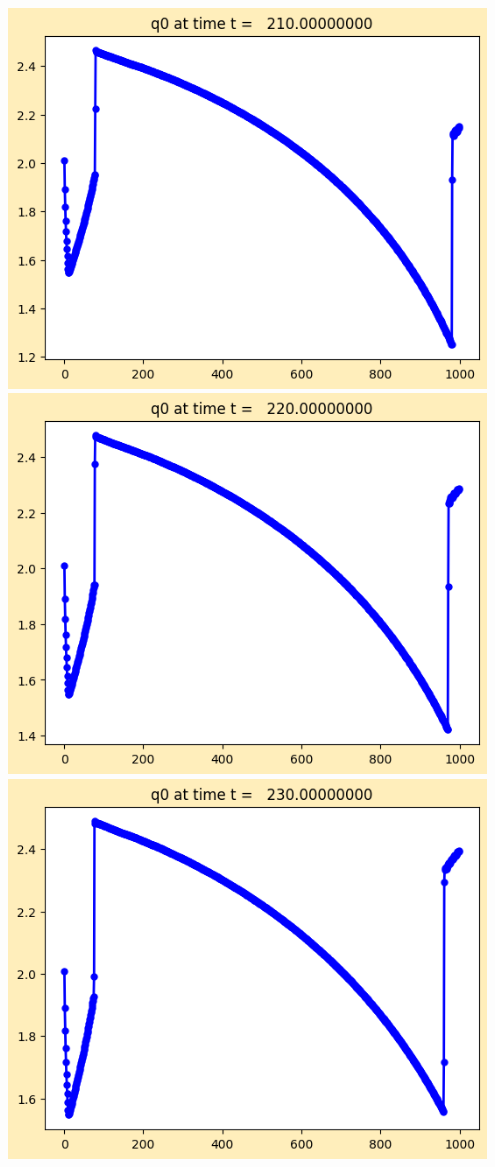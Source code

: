 \documentclass[11pt]{article}
\begin{document}
\vskip 10pt 
\includegraphics[width=0.95\textwidth]{frame0021fig1.png}
\vskip 10pt 
\includegraphics[width=0.95\textwidth]{frame0022fig1.png}
\vskip 10pt 
\includegraphics[width=0.95\textwidth]{frame0023fig1.png}
\end{document}
